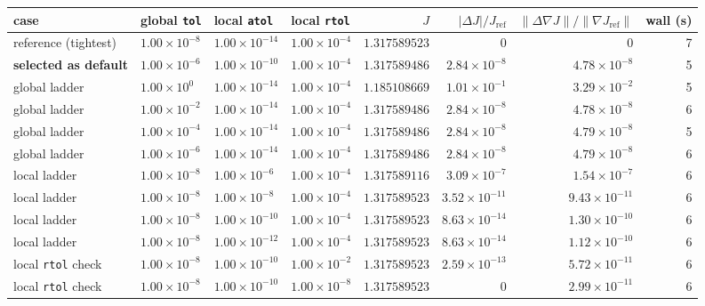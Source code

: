 \begin{tabular}{llllrrrr}
\toprule
case & global \texttt{tol} & local \texttt{atol} & local \texttt{rtol} & $J$ & $|\Delta J| / J_{\mathrm{ref}}$ & $\|\Delta \nabla J\| / \|\nabla J_{\mathrm{ref}}\|$ & wall (s) \\
\midrule
reference (tightest) & $1.00\times 10^{-8}$ & $1.00\times 10^{-14}$ & $1.00\times 10^{-4}$ & $1.317589523$ & $0$ & $0$ & 7 \\
\midrule
\textbf{selected as default} & $1.00\times 10^{-6}$ & $1.00\times 10^{-10}$ & $1.00\times 10^{-4}$ & $1.317589486$ & $2.84\times 10^{-8}$ & $4.78\times 10^{-8}$ & 5 \\
\midrule
global ladder & $1.00\times 10^{0}$ & $1.00\times 10^{-14}$ & $1.00\times 10^{-4}$ & $1.185108669$ & $1.01\times 10^{-1}$ & $3.29\times 10^{-2}$ & 5 \\
global ladder & $1.00\times 10^{-2}$ & $1.00\times 10^{-14}$ & $1.00\times 10^{-4}$ & $1.317589486$ & $2.84\times 10^{-8}$ & $4.78\times 10^{-8}$ & 6 \\
global ladder & $1.00\times 10^{-4}$ & $1.00\times 10^{-14}$ & $1.00\times 10^{-4}$ & $1.317589486$ & $2.84\times 10^{-8}$ & $4.79\times 10^{-8}$ & 5 \\
global ladder & $1.00\times 10^{-6}$ & $1.00\times 10^{-14}$ & $1.00\times 10^{-4}$ & $1.317589486$ & $2.84\times 10^{-8}$ & $4.79\times 10^{-8}$ & 6 \\
\midrule
local ladder & $1.00\times 10^{-8}$ & $1.00\times 10^{-6}$ & $1.00\times 10^{-4}$ & $1.317589116$ & $3.09\times 10^{-7}$ & $1.54\times 10^{-7}$ & 6 \\
local ladder & $1.00\times 10^{-8}$ & $1.00\times 10^{-8}$ & $1.00\times 10^{-4}$ & $1.317589523$ & $3.52\times 10^{-11}$ & $9.43\times 10^{-11}$ & 6 \\
local ladder & $1.00\times 10^{-8}$ & $1.00\times 10^{-10}$ & $1.00\times 10^{-4}$ & $1.317589523$ & $8.63\times 10^{-14}$ & $1.30\times 10^{-10}$ & 6 \\
local ladder & $1.00\times 10^{-8}$ & $1.00\times 10^{-12}$ & $1.00\times 10^{-4}$ & $1.317589523$ & $8.63\times 10^{-14}$ & $1.12\times 10^{-10}$ & 6 \\
\midrule
local \texttt{rtol} check & $1.00\times 10^{-8}$ & $1.00\times 10^{-10}$ & $1.00\times 10^{-2}$ & $1.317589523$ & $2.59\times 10^{-13}$ & $5.72\times 10^{-11}$ & 6 \\
local \texttt{rtol} check & $1.00\times 10^{-8}$ & $1.00\times 10^{-10}$ & $1.00\times 10^{-8}$ & $1.317589523$ & $0$ & $2.99\times 10^{-11}$ & 6 \\
\bottomrule
\end{tabular}
